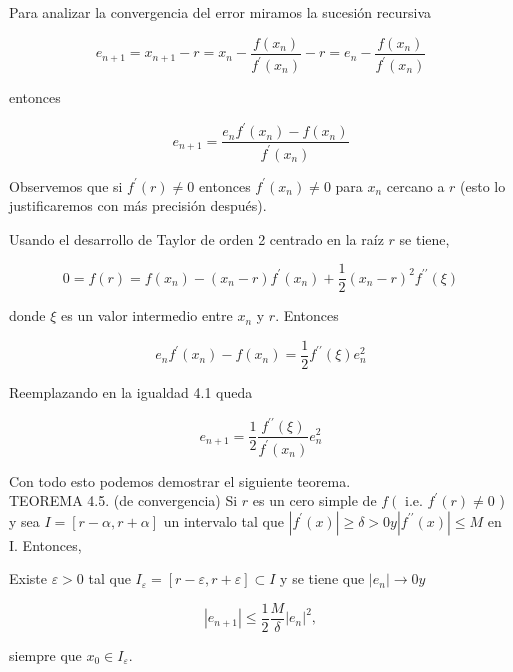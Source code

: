 \documentclass[10pt]{book}
\begin{document}
Para analizar la convergencia del error miramos la sucesión recursiva

$$
e_{n+1}=x_{n+1}-r=x_{n}-\frac{f\left(x_{n}\right)}{f^{\prime}\left(x_{n}\right)}-r=e_{n}-\frac{f\left(x_{n}\right)}{f^{\prime}\left(x_{n}\right)}
$$

entonces


\begin{equation*}
e_{n+1}=\frac{e_{n} f^{\prime}\left(x_{n}\right)-f\left(x_{n}\right)}{f^{\prime}\left(x_{n}\right)} \tag{4.1}
\end{equation*}


Observemos que si $f^{\prime}(r) \neq 0$ entonces $f^{\prime}\left(x_{n}\right) \neq 0$ para $x_{n}$ cercano a $r$ (esto lo justificaremos con más precisión después).

Usando el desarrollo de Taylor de orden 2 centrado en la raíz $r$ se tiene,

$$
0=f(r)=f\left(x_{n}\right)-\left(x_{n}-r\right) f^{\prime}\left(x_{n}\right)+\frac{1}{2}\left(x_{n}-r\right)^{2} f^{\prime \prime}(\xi)
$$

donde $\xi$ es un valor intermedio entre $x_{n}$ y $r$. Entonces

$$
e_{n} f^{\prime}\left(x_{n}\right)-f\left(x_{n}\right)=\frac{1}{2} f^{\prime \prime}(\xi) e_{n}^{2}
$$

Reemplazando en la igualdad 4.1 queda


\begin{equation*}
e_{n+1}=\frac{1}{2} \frac{f^{\prime \prime}(\xi)}{f^{\prime}\left(x_{n}\right)} e_{n}^{2} \tag{4.2}
\end{equation*}


Con todo esto podemos demostrar el siguiente teorema.\\
TEOREMA 4.5. (de convergencia) Si $r$ es un cero simple de $f\left(\right.$ i.e. $f^{\prime}(r) \neq 0$ ) y sea $I= [r-\alpha, r+\alpha]$ un intervalo tal que $\left|f^{\prime}(x)\right| \geq \delta>0 y\left|f^{\prime \prime}(x)\right| \leq M$ en I. Entonces,

Existe $\varepsilon>0$ tal que $I_{\varepsilon}=[r-\varepsilon, r+\varepsilon] \subset I$ y se tiene que $\left|e_{n}\right| \rightarrow 0 y$


\begin{equation*}
\left|e_{n+1}\right| \leq \frac{1}{2} \frac{M}{\delta}\left|e_{n}\right|^{2}, \tag{4.3}
\end{equation*}


siempre que $x_{0} \in I_{\varepsilon}$.
\end{document}

